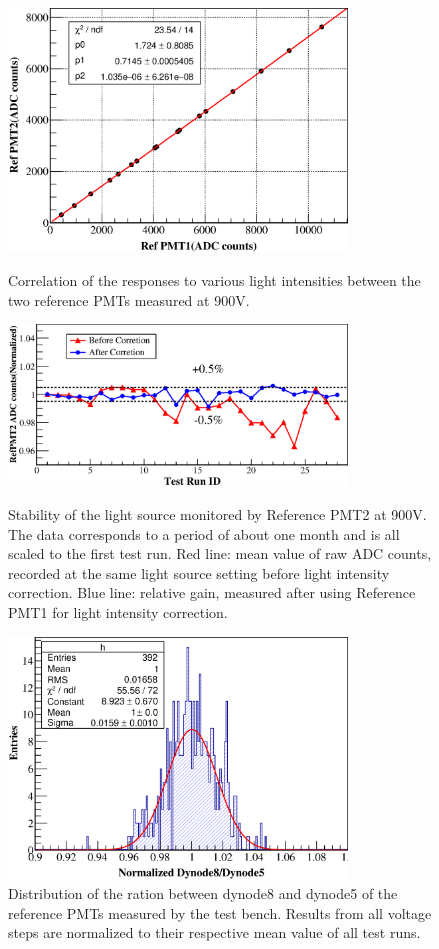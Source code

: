 \documentclass[5p, times]{elsarticle}
\begin{document}
\begin{figure}[h!]
 \centering
 \includegraphics[width=90mm]{RelativeGainRef}
\caption{Correlation of the responses to various light intensities between the two reference PMTs measured at 900V.}
\label{fig:refgain_relation}

 \centering
 \includegraphics[width=90mm]{led_stability}
\caption{Stability of the light source monitored by Reference PMT2 at 900V.
The data corresponds to a period of about one month and is all scaled to the first test run.
Red line: mean value of raw ADC counts, recorded at the same light source setting before light intensity correction.
Blue line: relative gain, measured after using Reference PMT1 for light intensity correction.}
\label{fig:led_stability}

 \centering
 \includegraphics[width=90mm]{RefDy58Dist}
\caption{Distribution of the ration between dynode8 and dynode5 of the reference PMTs measured by the test bench.
Results from all voltage steps are normalized to their respective mean value of all test runs.}
\label{fig:dy58_stabiltiy}
\end{figure} 
\end{document}
